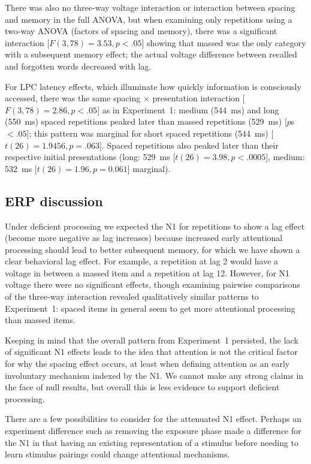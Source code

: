 There was also no three-way voltage interaction or interaction between spacing and memory in the full ANOVA, but when examining only repetitions using a two-way ANOVA (factors of spacing and memory), there was a significant interaction [$F(3,78)=3.53, p<.05$] showing that massed was the only category with a subsequent memory effect; the actual voltage difference between recalled and forgotten words decreased with lag.

For LPC latency effects, which illuminate how quickly information is consciously accessed, there was the same spacing $\times$ presentation interaction [$F(3,78)=2.86, p<.05$] as in Experiment~1: medium (544~ms) and long (550~ms) spaced repetitions peaked later than massed repetitions (529~ms) [$p$s~$<.05$]; this pattern was marginal for short spaced repetitions (544~ms) [$t(26)=1.9456, p=.063$].  Spaced repetitions also peaked later than their respective initial presentations (long: 529~ms [$t(26)=3.98, p<.0005$], medium: 532~ms [$t(26)=1.96, p=0.061$] marginal).

\subsection{ERP discussion}

Under deficient processing we expected the N1 for repetitions to show a lag effect (become more negative as lag increases) because increased early attentional processing should lead to better subsequent memory, for which we have shown a clear behavioral lag effect.  For example, a repetition at lag 2 would have a voltage in between a massed item and a repetition at lag 12.  However, for N1 voltage there were no significant effects, though examining pairwise comparisons of the three-way interaction revealed qualitatively similar patterns to Experiment~1:  spaced items in general seem to get more attentional processing than massed items.

Keeping in mind that the overall pattern from Experiment~1 persisted, the lack of significant N1 effects leads to the idea that attention is not the critical factor for why the spacing effect occurs, at least when defining attention as an early involuntary mechanism indexed by the N1.  We cannot make any strong claims in the face of null results, but overall this is less evidence to support deficient processing.

There are a few possibilities to consider for the attenuated N1 effect.
Perhaps an experiment difference such as removing the exposure phase made a difference for the N1 in that having an existing representation of a stimulus before needing to learn stimulus pairings could change attentional mechanisms.

